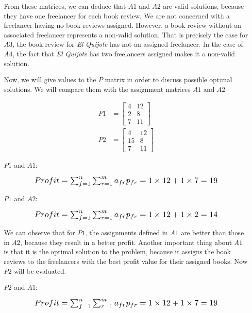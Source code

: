 From these matrices, we can deduce that $A1$ and $A2$ are valid solutions, because they have one freelancer for each book review. We are not concerned with a freelancer having no book reviews assigned. However, a book review without an associated freelancer represents a non-valid solution. That is precisely the case for $A3$, the book review for \textit{El Quijote} has not an assigned freelancer. In the case of $A4$, the fact that \textit{El Quijote} has two freelancers assigned makes it a non-valid solution.

Now, we will give values to the $P$ matrix in order to discuss possible optimal solutions. We will compare them with the assignment matrices $A1$ and $A2$

\begin{align}
    P1 &= 
    \begin{bmatrix}
        4 & 12\\ 
        2 & 8\\ 
        7 & 11 
    \end{bmatrix} \\
    P2 &= 
    \begin{bmatrix}
        4 & 12\\ 
        15 & 8\\ 
        7 & 11 
    \end{bmatrix}
\end{align}

$P1$ and $A1$:

\begin{equation}
    \scalebox{1.2}{$Profit = \sum_{f=1}^n \sum_{r=1}^m a_{fr} p_{fr} = 1 \times 12 + 1 \times 7 = 19$}
\end{equation}

$P1$ and $A2$:

\begin{equation}
    \scalebox{1.2}{$Profit = \sum_{f=1}^n \sum_{r=1}^m a_{fr} p_{fr} = 1 \times 12 + 1 \times 2 = 14$}
\end{equation}

We can observe that for $P1$, the assignments defined in $A1$ are better than those in $A2$, because they result in a better profit. Another important thing about $A1$ is that it is the optimal solution to the problem, because it assigns the book reviews to the freelancers with the best profit value for their assigned books. Now $P2$ will be evaluated.

$P2$ and $A1$:

\begin{equation}
    \scalebox{1.2}{$Profit = \sum_{f=1}^n \sum_{r=1}^m a_{fr} p_{fr} = 1 \times 12 + 1 \times 7 = 19$}
\end{equation}

